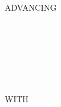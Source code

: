 \begin{syntax}
  \begin{1=}
    \recordname
    \begin{0-1}
      \begin{1=}
        \identifier \\
        \literal \\
        \functionname
      \end{1=}
    \end{0-1} \\

     \filename {}
    \begin{1=}
      \identifier \\
      \literal \\
      \functionname
    \end{1=}
  \end{1=}

  \begin{0-1}
    \begin{1=}
       \\
    \end{1=}
    ADVANCING
    \begin{1=}
      \begin{1=}
        \identifier \\
        \literal
      \end{1=}
      \begin{0-1}
         \\
      \end{0-1} \\

      \mnemonicname \\

    \end{1=}
  \end{0-1}

  \begin{0-1}
    WITH
    \begin{0-1}
    \end{0-1}
  \end{0-1}

  \begin{0+}
      \imperativestatement \\
       \imperativestatement
  \end{0+} \\

  \begin{0-1}
  \end{0-1}
\end{syntax}


